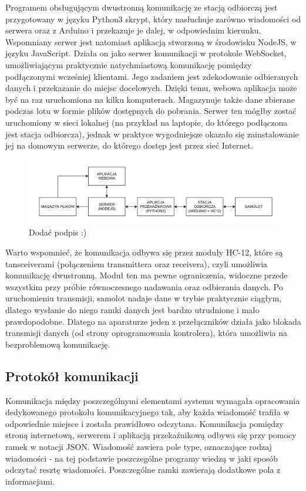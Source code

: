 \documentclass[12pt, a4paper]{article}
\begin{document}
Programem obsługującym dwustronną komunikację ze stacją odbiorczą jest przygotowany w języku Python3 skrypt, który nasłuchuje zarówno wiadomości od serwera oraz z Arduino i przekazuje je dalej, w odpowiednim kierunku. Wspomniany serwer jest natomiast aplikacją stworzoną w środowisku NodeJS, w języku JavaScript. Działa on jako serwer komunikacji w protokole WebSocket, umożliwiającym praktycznie natychmiastową komunikację pomiędzy podłączonymi wcześniej klientami. Jego zadaniem jest zdekodowanie odbieranych danych i przekazanie do miejsc docelowych. Dzięki temu, webowa aplikacja może być na raz uruchomiona na kilku komputerach. Magazynuje także dane zbierane podczas lotu w formie plików dostępnych do pobrania. Serwer ten mógłby zostać uruchomiony w sieci lokalnej (na przykład na laptopie, do którego podłączona jest stacja odbiorcza), jednak w praktyce wygodniejsze okazało się zainstalowanie jej na domowym serwerze, do którego dostęp jest przez sieć Internet.
 \begin{figure}[ht]
    \centering
    \includegraphics[width=1\textwidth]{diagram_env}
    \caption{Dodać podpis :)}
\end{figure}

Warto wspomnieć, że komunikacja odbywa się przez moduły HC-12, które są tansceiverami (połączeniem transmittera oraz receivera), czyli umożliwia komunikację dwustronną. Moduł ten ma pewne ograniczenia, widoczne przede wszystkim przy próbie równoczesnego nadawania oraz odbierania danych. Po uruchomieniu transmisji, samolot nadaje dane w trybie praktycznie ciągłym, dlatego wysłanie do niego ramki danych jest bardzo utrudnione i mało prawdopodobne. Dlatego na aparaturze jeden z przełączników działa jako blokada transmisji danych (od strony oprogramowania kontrolera), która umożliwia na bezproblemową komunikację.

\FloatBarrier
\subsection{Protokół komunikacji}
Komunikacja między poszczególnymi elementami systemu wymagała opracowania dedykowanego protokołu komunikacyjnego tak, aby każda wiadomość trafiła w odpowiednie miejsce i została prawidłowo odczytana. 
Komunikacja pomiędzy stroną internetową, serwerem i aplikacją przekaźnikową odbywa się przy pomocy ramek w notacji JSON. Wiadomość zawiera pole type, oznaczające rodzaj wiadomości - na tej podstawie poszczególne programy wiedzą w jaki sposób odczytać resztę wiadomości. Poszczególne ramki zawierają dodatkowe pola z informacjami. 
\end{document}
